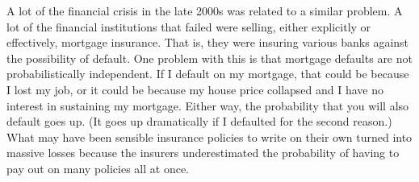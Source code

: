 A lot of the financial crisis in the late 2000s was related to a similar problem. A lot of the financial institutions that failed were selling, either explicitly or effectively, mortgage insurance. That is, they were insuring various banks against the possibility of default. One problem with this is that mortgage defaults are not probabilistically independent. If I default on my mortgage, that could be because I lost my job, or it could be because my house price collapsed and I have no interest in sustaining my mortgage. Either way, the probability that you will also default goes up. (It goes up dramatically if I defaulted for the second reason.) What may have been sensible insurance policies to write on their own turned into massive losses because the insurers underestimated the probability of having to pay out on many policies all at once.